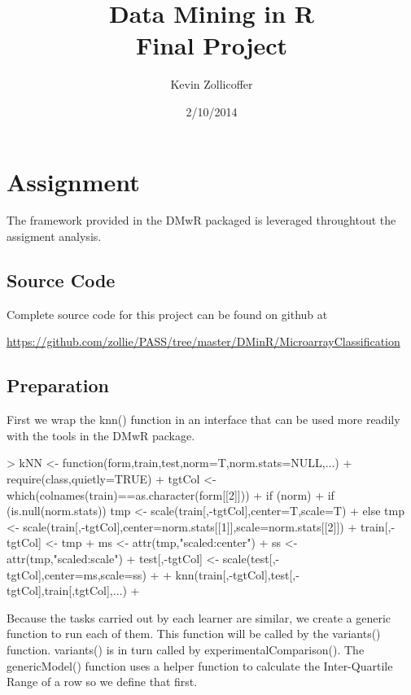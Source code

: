 \documentclass{article}
\author{Kevin Zollicoffer}
\title{Data Mining in R\\Final Project}
\date{2/10/2014}
\begin{document}
\maketitle


\section*{Assignment}
The framework provided in the DMwR packaged is leveraged throughtout the assigment analysis. 

\subsection*{Source Code}
Complete source code for this project can be found on github at 

\url{https://github.com/zollie/PASS/tree/master/DMinR/MicroarrayClassification}

\subsection*{Preparation}
First we wrap the knn() function in an interface that can be used more readily with the tools in the DMwR package. 

\begin{Schunk}
\begin{Sinput}
> kNN <- function(form,train,test,norm=T,norm.stats=NULL,...) {
+   require(class,quietly=TRUE)
+   tgtCol <- which(colnames(train)==as.character(form[[2]]))
+   if (norm) {
+     if (is.null(norm.stats)) tmp <- scale(train[,-tgtCol],center=T,scale=T)
+     else tmp <- scale(train[,-tgtCol],center=norm.stats[[1]],scale=norm.stats[[2]])
+     train[,-tgtCol] <- tmp
+     ms <- attr(tmp,"scaled:center")
+     ss <- attr(tmp,"scaled:scale")
+     test[,-tgtCol] <- scale(test[,-tgtCol],center=ms,scale=ss)
+   }
+   knn(train[,-tgtCol],test[,-tgtCol],train[,tgtCol],...)
+ }
\end{Sinput}
\end{Schunk}

Because the tasks carried out by each learner are similar, we create a generic function to run each of them. This function will be called by the variants() function. variants() is in turn called by experimentalComparison(). The genericModel() function uses a helper function to calculate the Inter-Quartile Range of a row so we define that first. 
\end{document}
